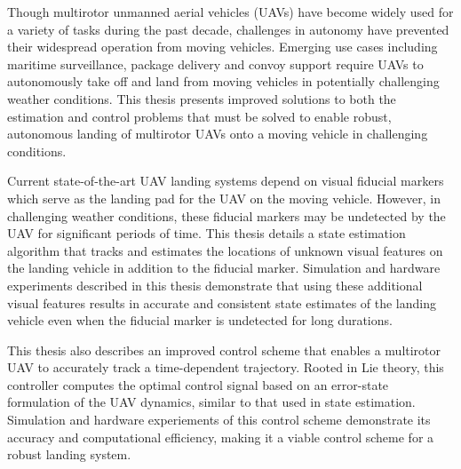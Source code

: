 \afterpage{\cleardoublepage}
Though multirotor unmanned aerial vehicles (UAVs) have become widely used for a variety of
tasks during the past decade, challenges in autonomy have prevented their
widespread operation from moving vehicles. Emerging use cases including maritime
surveillance, package delivery and convoy support require UAVs to autonomously
take off and land from moving vehicles in potentially challenging weather
conditions. This thesis presents improved solutions to both the estimation and
control problems that must be solved
to enable robust, autonomous landing of multirotor UAVs onto a moving vehicle in
challenging conditions.

Current state-of-the-art UAV landing systems depend on visual fiducial markers
which serve as the landing pad for the UAV on the moving vehicle. However, in challenging weather
conditions, these fiducial markers may be undetected by the UAV for significant
periods of time. This thesis details a state estimation algorithm that tracks
and estimates the locations of unknown visual features on the landing vehicle in
addition to the fiducial marker. Simulation and hardware experiments described
in this thesis demonstrate that using these additional visual features results in
accurate and consistent state estimates of the landing vehicle even when the
fiducial marker is undetected for long durations.

This thesis also describes an improved control scheme that enables a multirotor
UAV to accurately track a time-dependent trajectory. Rooted in Lie theory, this
controller computes the optimal control signal based on an error-state
formulation of the UAV dynamics, similar to that used in state estimation.
Simulation and hardware experiements of this control scheme demonstrate its
accuracy and computational efficiency, making it a viable control scheme for a
robust landing system.
